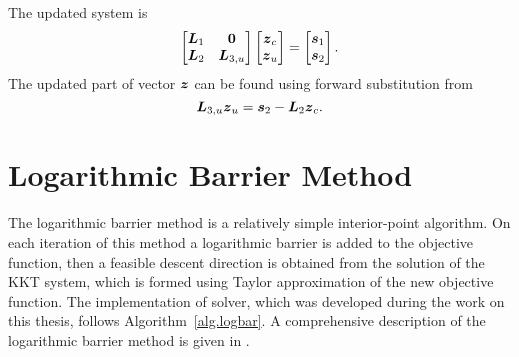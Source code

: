 The updated system is 
$$
\begin{bmatrix}
    \mbox{\boldmath $L$}_1 & \mbox{\boldmath $0$}\\
    \mbox{\boldmath $L$}_2 & \mbox{\boldmath $L$}_{3,u}\\
\end{bmatrix}
\begin{bmatrix}
    \mbox{\boldmath $z$}_c\\
    \mbox{\boldmath $z$}_u\\
\end{bmatrix}
 = 
\begin{bmatrix}
    \mbox{\boldmath $s$}_1\\
    \mbox{\boldmath $s$}_2\\
\end{bmatrix}.
$$
The updated part of vector $\mbox{\boldmath $z$}$ can be found using forward substitution from
$$
\mbox{\boldmath $L$}_{3,u} \mbox{\boldmath $z$}_u = \mbox{\boldmath $s$}_2 - \mbox{\boldmath $L$}_2 \mbox{\boldmath $z$}_c.
$$



\section{Logarithmic Barrier Method}\label{sec.ip}
The logarithmic barrier method is a relatively simple interior-point algorithm. 
On each iteration of this method a logarithmic barrier is added to the objective 
function, then a feasible descent direction is obtained from the solution of the 
\ac{KKT} system, which is formed using Taylor approximation of the new objective 
function. The implementation of solver, which was developed during the work on 
this thesis, follows Algorithm~\ref{alg.logbar}. A comprehensive description of 
the logarithmic barrier method is given in \cite{BoydCVX}.

